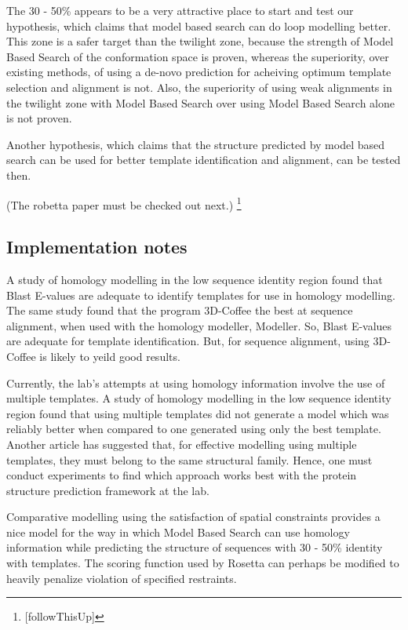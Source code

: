 \documentclass[10pt]{report}
\begin{document}
The 30 - 50\% appears to be a very attractive place to start and test our hypothesis, which claims that model based search can do loop modelling better. This zone is a safer target than the twilight zone, because the strength of Model Based Search of the conformation space is proven, whereas the superiority, over existing methods, of using a de-novo prediction for acheiving optimum template selection and alignment is not. Also, the superiority of using weak alignments in the twilight zone with Model Based Search over using Model Based Search alone is not proven.

Another hypothesis, which claims that the structure predicted by model based search can be used for better template identification and alignment, can be tested then.

(The robetta paper must be checked out next.) \footnote{[followThisUp]}

\subsection{Implementation notes}

A study of homology modelling in the low sequence identity region found that Blast E-values are adequate to identify templates for use in homology modelling. The same study found that the program 3D-Coffee the best at sequence alignment, when used with the homology modeller, Modeller.\cite{dalton07} So, Blast E-values are adequate for template identification. But, for sequence alignment, using 3D-Coffee is likely to yeild good results.

Currently, the lab's attempts at using homology information involve the use of multiple templates. A study of homology modelling in the low sequence identity region found that using multiple templates did not generate a model which was reliably better when compared to one generated using only the best template.\cite{dalton07} Another article has suggested that, for effective modelling using multiple templates, they must belong to the same structural family. \cite{bates01} Hence, one must conduct experiments to find which approach works best with the protein structure prediction framework at the lab.

Comparative modelling using the satisfaction of spatial constraints provides a nice model for the way in which Model Based Search can use homology information while predicting the structure of sequences with 30 - 50\% identity with templates. The scoring function used by Rosetta can perhaps be modified to heavily penalize violation of specified restraints.
\end{document}
